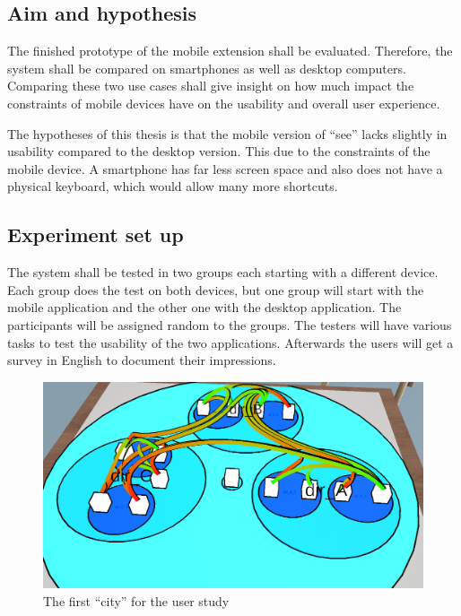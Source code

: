 \subsection{Aim and hypothesis}
\label{aim}
The finished prototype of the mobile extension shall be evaluated. 
Therefore, the system shall be compared on smartphones as well as desktop computers. 
Comparing these two use cases shall give insight on how much impact the constraints of mobile devices have on the usability and overall user experience.

The hypotheses of this thesis is that the mobile version of \enquote{\gls{see}} lacks slightly in usability compared to the desktop version.
This due to the constraints of the mobile device. 
A smartphone has far less screen space and also does not have a physical keyboard, which would allow many more shortcuts.
\subsection{Experiment set up}
\label{experiment}
The system shall be tested in two groups each starting with a different device. 
Each group does the test on both devices, but one group will start with the mobile application and the other one with the desktop application.
The participants will be assigned random to the groups.
The testers will have various tasks to test the usability of the two applications. 
Afterwards the users will get a survey in English to document their impressions.
\begin{figure}[htb]
  \centering
  \includegraphics[width=1\textwidth]{Evaluation/img/city_1.png}
  \caption{The first \enquote{\gls{city}} for the user study}\label{fig:city1}
\end{figure}

